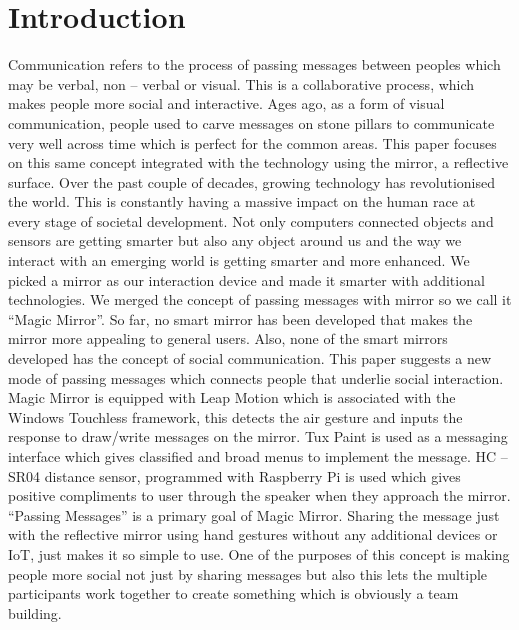 
\section{Introduction}

Communication refers to the process of passing messages between peoples which may be verbal, non – verbal or visual. This is a collaborative process, which makes people more social and interactive. Ages ago, as a form of visual communication, people used to carve messages on stone pillars to communicate very well across time which is perfect for the common areas. This paper focuses on this same concept integrated with the technology using the mirror, a reflective surface.
Over the past couple of decades, growing technology has revolutionised the world. This is constantly having a massive impact on the human race at every stage of societal development. Not only computers connected objects and sensors are getting smarter but also any object around us and the way we interact with an emerging world is getting smarter and more enhanced. We picked a mirror as our interaction device and made it smarter with additional technologies. We merged the concept of passing messages with mirror so we call it “Magic Mirror”. So far, no smart mirror has been developed that makes the mirror more appealing to general users. Also, none of the smart mirrors developed has the concept of social communication. This paper suggests a new mode of passing messages which connects people that underlie social interaction.
Magic Mirror is equipped with Leap Motion which is associated with the Windows Touchless framework, this detects the air gesture and inputs the response to draw/write messages on the mirror. Tux Paint is used as a messaging interface which gives classified and broad menus to implement the message. HC – SR04 distance sensor, programmed with Raspberry Pi is used which gives positive compliments to user through the speaker when they approach the mirror.
“Passing Messages” is a primary goal of Magic Mirror. Sharing the message just with the reflective mirror using hand gestures without any additional devices or IoT, just makes it so simple to use. One of the purposes of this concept is making people more social not just by sharing messages but also this lets the multiple participants work together to create something which is obviously a team building.

